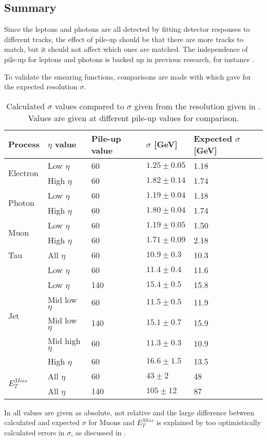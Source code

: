 \subsection{Summary}\label{sec:res:subsec:sum}
Since the leptons and photons are all detected by fitting detector responses to different tracks, the effect of pile-up should be that there are more tracks to match, but it should not affect which ones are matched. The independence of pile-up for leptons and photons is backed up in previous research, for instance \citep{Electronperf:2011, ATLAS:LOI2}.

To validate the smearing functions, comparisons are made with \citep{ATL-PHYS-PUB-2013-004} which gave  for the expected resolution $\sigma$.
\renewcommand{\arraystretch}{1.2} %
\begin{table}[H]
\begin{center}
\begin{tabular}{|l|l|l|l|l|}
\hline
Process& $\eta$ value & Pile-up value &$\sigma$ [GeV]& Expected $\sigma$ [GeV]\\ \hline
\multirow{2}{*}{Electron}& Low $\eta$&60&$1.25 \pm 0.05$&1.18\\
&High $\eta$&60&$1.82 \pm 0.14$&1.74\\ \hline
\multirow{2}{*}{Photon} & Low $\eta$&60&$1.19 \pm 0.04$&1.18\\
&High $\eta$&60&$1.80 \pm 0.04$&1.74\\ \hline
\multirow{2}{*}{Muon} & Low $\eta$&60&$1.19 \pm 0.05$&1.50\\
&High $\eta$&60&$1.71 \pm 0.09$&2.18\\ \hline
Tau& All $\eta$&60&$10.9 \pm 0.3$&10.3\\ \hline
\multirow{6}{*}{Jet} &Low $\eta$&60&$11.4 \pm 0.4$&11.6\\
&Low $\eta$&140&$15.4 \pm 0.5$&15.8\\
&Mid low $\eta$&60&$11.5 \pm 0.5$&11.9\\
&Mid low $\eta$&140&$15.1 \pm 0.7$&15.9\\
&Mid high $\eta$&60&$11.3 \pm 0.3$&10.9\\
&High $\eta$&60&$16.6 \pm 1.5$&13.5\\ \hline
\multirow{2}{*}{$E_T^{Miss}$}&All $\eta$&60&$43 \pm 2$&48\\ 
&All $\eta$&140&$105 \pm 12$&87\\  \hline
\end{tabular}
\end{center}
\caption{Calculated $\sigma$ values compared to $\sigma$ given from the resolution given in . Values are given at different pile-up values for comparison.}
\label{tab:sigmaval}
\end{table}
\renewcommand{\arraystretch}{1.0} %
In  all values are given as absolute, not relative and the large difference between calculated and expected $\sigma$ for Muons and $E_T^{Miss}$ is explained by too optimistically calculated errors in $\sigma$, as discussed in .

